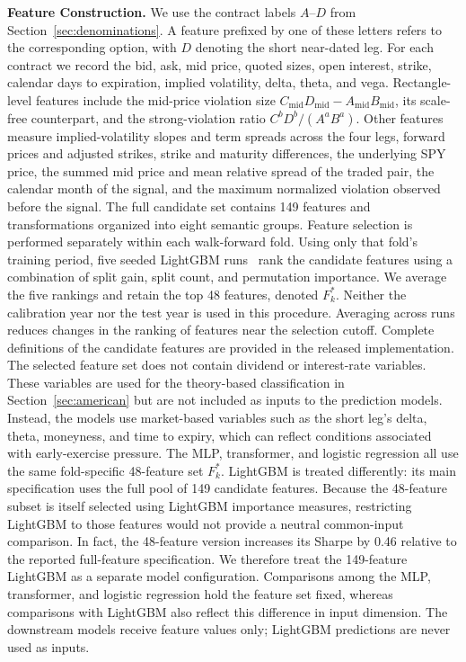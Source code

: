 \documentclass[sigconf,review,anonymous]{acmart}
\begin{document}
\smallskip\noindent\textbf{Feature Construction.}
\label{sec:features}
We use the contract labels $A$--$D$ from Section~\ref{sec:denominations}. A feature prefixed by one of these letters refers to the corresponding option, with $D$ denoting the short near-dated leg. For each contract we record the bid, ask, mid price, quoted sizes, open interest, strike, calendar days to expiration, implied volatility, delta, theta, and vega.
Rectangle-level features include the mid-price violation size $C_{\mathrm{mid}}D_{\mathrm{mid}}-A_{\mathrm{mid}}B_{\mathrm{mid}}$, its scale-free counterpart, and the strong-violation ratio $C^bD^b/(A^aB^a)$. Other features measure implied-volatility slopes and term spreads across the four legs, forward prices and adjusted strikes, strike and maturity differences, the underlying SPY price, the summed mid price and mean relative spread of the traded pair, the calendar month of the signal, and the maximum normalized violation observed before the signal.
The full candidate set contains 149 features and transformations organized into eight semantic groups. Feature selection is performed separately within each walk-forward fold. Using only that fold's training period, five seeded LightGBM runs~\cite{ke2017lightgbm} rank the candidate features using a combination of split gain, split count, and permutation importance. We average the five rankings and retain the top 48 features, denoted $F_k^\ast$. Neither the calibration year nor the test year is used in this procedure. Averaging across runs reduces changes in the ranking of features near the selection cutoff. Complete definitions of the candidate features are provided in the released implementation.
The selected feature set does not contain dividend or interest-rate variables. These variables are used for the theory-based classification in Section~\ref{sec:american} but are not included as inputs to the prediction models. Instead, the models use market-based variables such as the short leg's delta, theta, moneyness, and time to expiry, which can reflect conditions associated with early-exercise pressure.
The MLP, transformer, and logistic regression all use the same fold-specific 48-feature set $F_k^\ast$. LightGBM is treated differently: its main specification uses the full pool of 149 candidate features. Because the 48-feature subset is itself selected using LightGBM importance measures, restricting LightGBM to those features would not provide a neutral common-input comparison. In fact, the 48-feature version increases its Sharpe by 0.46 relative to the reported full-feature specification. We therefore treat the 149-feature LightGBM as a separate model configuration. Comparisons among the MLP, transformer, and logistic regression hold the feature set fixed, whereas comparisons with LightGBM also reflect this difference in input dimension. The downstream models receive feature values only; LightGBM predictions are never used as inputs.
\end{document}

